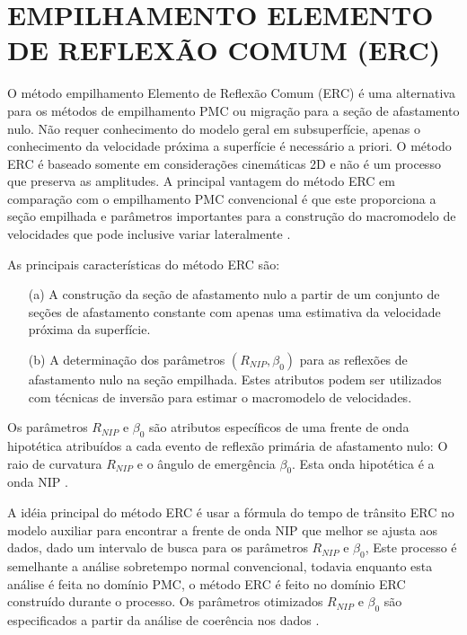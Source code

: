 %
% 
% 
% 
% 
% 
% 

\chapter{EMPILHAMENTO ELEMENTO DE REFLEXÃO COMUM (ERC)}
\label{cap2:cre}

O método empilhamento Elemento de Reflexão Comum (ERC) é uma alternativa para os métodos de empilhamento PMC ou
migração para a seção de afastamento nulo. Não requer conhecimento do modelo geral em subsuperfície, apenas
o conhecimento da velocidade próxima a superfície é necessário a priori.
O método ERC é baseado somente em considerações cinemáticas 2D e não é
um processo que preserva as amplitudes.
A principal vantagem do método ERC em comparação com o empilhamento PMC convencional
é que este proporciona a seção empilhada e parâmetros importantes para a construção do macromodelo de 
velocidades que pode inclusive variar lateralmente \cite{cre}.

As principais características do método ERC são:
\begin{enumerate}
 \item[(a)] A construção da seção de afastamento nulo a partir de um conjunto de seções de afastamento constante
com apenas uma estimativa da velocidade próxima da superfície.

 \item[(b)] A determinação dos parâmetros $(R_{NIP},\beta_0)$ para as reflexões de afastamento nulo na seção empilhada.
Estes atributos podem ser utilizados com técnicas de inversão para estimar o macromodelo de velocidades.
\end{enumerate}

Os parâmetros $R_{NIP}$ e $\beta_0$ 
são atributos específicos de uma frente de onda hipotética atribuídos a cada evento de reflexão
primária de afastamento nulo: O raio de curvatura $R_{NIP}$ e o ângulo de emergência $\beta_0$. Esta onda hipotética é
a onda NIP \cite{hubral}.

A idéia principal do método ERC é usar a fórmula do tempo de trânsito ERC no modelo auxiliar para
encontrar a frente de onda NIP que melhor se ajusta aos dados, dado um intervalo
de busca para os parâmetros $R_{NIP}$ e $\beta_0$,
Este processo é semelhante a análise sobretempo normal convencional, todavia enquanto esta análise é feita no
domínio PMC, o método ERC é feito no domínio ERC construído durante o processo. Os parâmetros otimizados $R_{NIP}$ e $\beta_0$
são especificados a partir da análise de coerência nos dados \cite{cre}.

